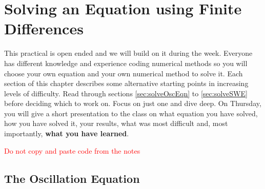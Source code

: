
\chapter{Solving an Equation using Finite Differences}

This practical is open ended and we will build on it during the week.
Everyone has different knowledge and experience coding numerical methods
so you will choose your own equation and your own numerical method
to solve it. Each section of this chapter describes some alternative
starting points in increasing levels of difficulty. Read through sections
\ref{sec:solveOscEqn} to \ref{sec:solveSWE} before deciding which
to work on. Focus on just one and dive deep. On Thursday, you will
give a short presentation to the class on what equation you have solved,
how you have solved it, your results, what was most difficult and,
most importantly, \textbf{what you have learned}.
\begin{center}
\textcolor{red}{Do not copy and paste code from the notes}
\par\end{center}

\section{The Oscillation Equation \protect\label{sec:solveOscEqn}}

